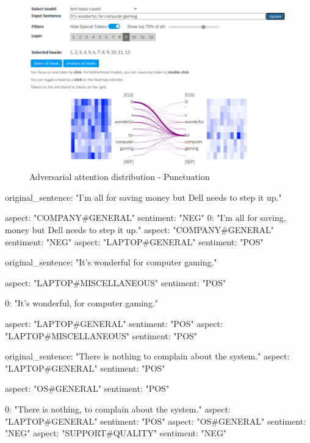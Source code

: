 \begin{figure}
    \centering
    \includegraphics[width =.8\textwidth]{img/attention_punctuation_modified.png}
    \caption{Adversarial attention distribution - Punctuation}
    \label{fig:attention_punct_modified}
\end{figure}


original_sentence: "I'm all for saving money but Dell needs to step it up."

    aspect: "COMPANY#GENERAL"
    sentiment: "NEG"
0: "I'm all for saving, money but Dell needs to step it up."
aspect: "COMPANY#GENERAL"
sentiment: "NEG"
aspect: "LAPTOP#GENERAL"
sentiment: "POS"


original_sentence: "It's wonderful for computer gaming."

    aspect: "LAPTOP#MISCELLANEOUS"
    sentiment: "POS"


0: "It's wonderful, for computer gaming."


aspect: "LAPTOP#GENERAL"
sentiment: "POS"
aspect: "LAPTOP#MISCELLANEOUS"
sentiment: "POS"



original_sentence: "There is nothing to complain about the system."
aspect: "LAPTOP#GENERAL"
sentiment: "POS"

    aspect: "OS#GENERAL"
    sentiment: "POS"

0: "There is nothing, to complain about the system."
aspect: "LAPTOP#GENERAL"
sentiment: "POS"
aspect: "OS#GENERAL"
sentiment: "NEG"
aspect: "SUPPORT#QUALITY"
sentiment: "NEG"
